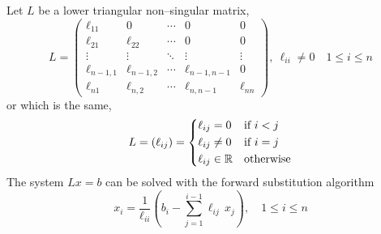 Let $L$ be a lower triangular non--singular matrix,
\begin{equation}
	L = 
	\begin{pmatrix}
		\ell_{11} 		& 0 			& \cdots & 0 				& 0  \\
		\ell_{21} 		& \ell_{22} 	& \cdots & 0 				& 0 \\
		\vdots 			& \vdots 		& \ddots & \vdots 	  		& \vdots \\
		\ell_{n-1,1} 	& \ell_{n-1,2} 	& \cdots & \ell_{n-1,n-1} 	& 0 \\
		\ell_{n1} 		& \ell_{n,2} 	& \cdots & \ell_{n,n-1} 	& \ell_{nn}
	\end{pmatrix},
	\
	\ell_{ii} \neq 0 \quad 1 \leq i \leq n
\end{equation}
or which is the same,
\begin{equation}
	L = (\ell_{ij}) = 
	\left\{
	\begin{aligned}
		&\ell_{ij} = 0 			& 	&\text{if } i < j \\
		&\ell_{ij} \neq 0 		& 	&\text{if } i = j \\
		&\ell_{ij} \in \mathbb{R} 	& 	&\text{otherwise} 
	\end{aligned}
	\right.
\end{equation}
The system $L x = b$ can be solved with the forward substitution algorithm
\begin{equation}
	x_i = 
	\frac{1}{\ell_{ii}} 
	\left(
	b_i - \sum_{j=1}^{i-1} \ell_{ij} \, x_j
	\right),
	\quad
	1 \leq i \leq n
\end{equation}

